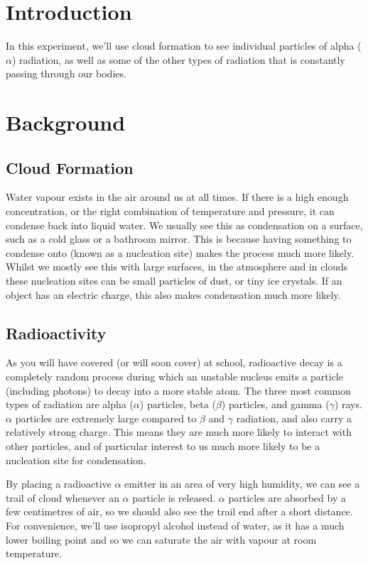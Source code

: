 \documentclass{article}
\begin{document}
\section{Introduction}

In this experiment, we'll use cloud formation to see individual particles of alpha ($\alpha$) radiation, as well as some of the other types of radiation that is constantly passing through our bodies.

\section{Background}

\subsection{Cloud Formation}

Water vapour exists in the air around us at all times. If there is a high enough concentration, or the right combination of temperature and pressure, it can condense back into liquid water. We usually see this as condensation on a surface, such as a cold glass or a bathroom mirror. This is because having something to condense onto (known as a nucleation site) makes the process much more likely. Whilst we mostly see this with large surfaces, in the atmosphere and in clouds these nucleation sites can be small particles of dust, or tiny ice crystals. If an object has an electric charge, this also makes condensation much more likely.

\subsection{Radioactivity}

As you will have covered (or will soon cover) at school, radioactive decay is a completely random process during which an unstable nucleus emits a particle (including photons) to decay into a more stable atom. The three most common types of radiation are alpha ($\alpha$) particles, beta ($\beta$) particles, and gamma ($\gamma$) rays. $\alpha$ particles are extremely large compared to $\beta$ and $\gamma$ radiation, and also carry a relatively strong charge. This means they are much more likely to interact with other particles, and of particular interest to us much more likely to be a nucleation site for condensation.

By placing a radioactive $\alpha$ emitter in an area of very high humidity, we can see a trail of cloud whenever an $\alpha$ particle is released. $\alpha$ particles are absorbed by a few centimetres of air, so we should also see the trail end after a short distance. For convenience, we'll use isopropyl alcohol instead of water, as it has a much lower boiling point and so we can saturate the air with vapour at room temperature.
\end{document}
